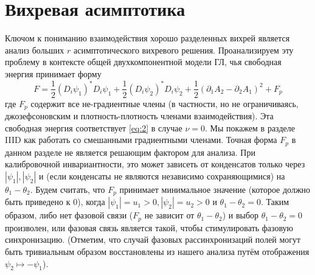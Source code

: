 \section{Вихревая асимптотика}

Ключом к пониманию взаимодействия хорошо разделенных вихрей является анализ  
больших \( r \) асимптотического вихревого решения. Проанализируем эту 
проблему в контексте общей двухкомпонентной модели ГЛ, чья свободная энергия 
принимает форму
\begin{equation}
    F = \frac{1}{2}\left( D_i \psi_1 \right)^{*} D_i \psi_1 + 
        \frac{1}{2}\left( D_i \psi_2 \right)^{*} D_i \psi_2 + 
        \frac{1}{2}\left( \partial_1 A_2 - \partial_2 A_1 \right)^2 + F_p
    \label{eq:3}
\end{equation}
где \( F_p \) содержит все не-градиентные члены (в частности, но не 
ограничиваясь, джозефсоновским и плотность-плотность членами взаимодействия). 
Эта свободная энергия соответствует \eqref{eq:2} в случае \( \nu = 0 \). Мы 
покажем в разделе IIID как работать со смешанными градиентными членами. Точная 
форма \( F_p \) в данном разделе не является решающим фактором для анализа.
При калибровочной инвариантности, это может зависеть от конденсатов только 
через \( |\psi_1|, |\psi_2| \) и (если конденсаты не являются независимо 
сохраняющимися) на \( \theta_1 - \theta_2 \). Будем считать, что \( F_p \) 
принимает минимальное значение (которое должно быть приведено к 0), когда 
\( |\psi_1| = u_1 > 0, |\psi_2| = u_2 > 0 \) и \( \theta_1 - \theta_2 = 0 \).
Таким образом, либо нет фазовой связи (\( F_p \) не зависит от 
\( \theta_1 - \theta_2 \)) и выбор \( \theta_1 - \theta_2 = 0 \) произволен, 
или фазовая связь является такой, чтобы стимулировать фазовую синхронизацию.
(Отметим, что случай фазовых рассинхронизаций полей могут быть тривиальным 
образом восстановлены из нашего анализа путём отображения 
\( \psi_2 \mapsto -\psi_1 \)).

